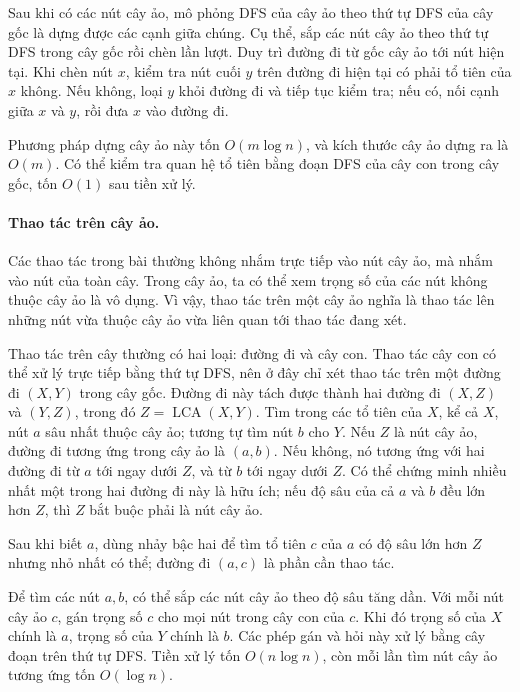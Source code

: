 \documentclass[11pt]{article}
\begin{document}
Sau khi có các nút cây ảo, mô phỏng DFS của cây ảo theo thứ tự DFS của cây
gốc là dựng được các cạnh giữa chúng. Cụ thể, sắp các nút cây ảo theo thứ tự
DFS trong cây gốc rồi chèn lần lượt. Duy trì đường đi từ gốc cây ảo tới nút
hiện tại. Khi chèn nút \(x\), kiểm tra nút cuối \(y\) trên đường đi hiện tại
có phải tổ tiên của \(x\) không. Nếu không, loại \(y\) khỏi đường đi và tiếp
tục kiểm tra; nếu có, nối cạnh giữa \(x\) và \(y\), rồi đưa \(x\) vào đường đi.

Phương pháp dựng cây ảo này tốn \(O(m\log n)\), và kích thước cây ảo dựng ra
là \(O(m)\). Có thể kiểm tra quan hệ tổ tiên bằng đoạn DFS của cây con trong
cây gốc, tốn \(O(1)\) sau tiền xử lý.

\paragraph{Thao tác trên cây ảo.}
Các thao tác trong bài thường không nhắm trực tiếp vào nút cây ảo, mà nhắm vào
nút của toàn cây. Trong cây ảo, ta có thể xem trọng số của các nút không thuộc
cây ảo là vô dụng. Vì vậy, thao tác trên một cây ảo nghĩa là thao tác lên
những nút vừa thuộc cây ảo vừa liên quan tới thao tác đang xét.

Thao tác trên cây thường có hai loại: đường đi và cây con. Thao tác cây con có
thể xử lý trực tiếp bằng thứ tự DFS, nên ở đây chỉ xét thao tác trên một đường
đi \((X,Y)\) trong cây gốc. Đường đi này tách được thành hai đường đi
\((X,Z)\) và \((Y,Z)\), trong đó \(Z=\operatorname{LCA}(X,Y)\). Tìm trong các
tổ tiên của \(X\), kể cả \(X\), nút \(a\) sâu nhất thuộc cây ảo; tương tự tìm
nút \(b\) cho \(Y\). Nếu \(Z\) là nút cây ảo, đường đi tương ứng trong cây ảo
là \((a,b)\). Nếu không, nó tương ứng với hai đường đi từ \(a\) tới ngay dưới
\(Z\), và từ \(b\) tới ngay dưới \(Z\). Có thể chứng minh nhiều nhất một trong
hai đường đi này là hữu ích; nếu độ sâu của cả \(a\) và \(b\) đều lớn hơn
\(Z\), thì \(Z\) bắt buộc phải là nút cây ảo.

Sau khi biết \(a\), dùng nhảy bậc hai để tìm tổ tiên \(c\) của \(a\) có độ sâu
lớn hơn \(Z\) nhưng nhỏ nhất có thể; đường đi \((a,c)\) là phần cần thao tác.

Để tìm các nút \(a,b\), có thể sắp các nút cây ảo theo độ sâu tăng dần. Với
mỗi nút cây ảo \(c\), gán trọng số \(c\) cho mọi nút trong cây con của \(c\).
Khi đó trọng số của \(X\) chính là \(a\), trọng số của \(Y\) chính là \(b\).
Các phép gán và hỏi này xử lý bằng cây đoạn trên thứ tự DFS. Tiền xử lý tốn
\(O(n\log n)\), còn mỗi lần tìm nút cây ảo tương ứng tốn \(O(\log n)\).
\end{document}
